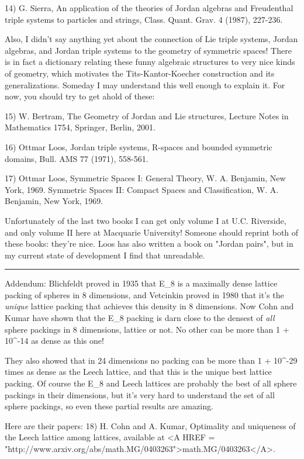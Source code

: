 14) G. Sierra, An application of the theories of Jordan algebras and 
Freudenthal triple systems to particles and strings, Class. Quant. Grav. 
4 (1987), 227-236.  

Also, I didn't say anything yet about the connection of Lie triple
systems, Jordan algebras, and Jordan triple systems to the geometry 
of symmetric spaces!  There is in fact a dictionary relating these 
funny algebraic structures to very nice kinds of geometry, which
motivates the Tits-Kantor-Koecher construction and its generalizations.
Someday I may understand this well enough to explain it.  For now, 
you should try to get ahold of these:

15) W. Bertram, The Geometry of Jordan and Lie structures, 
Lecture Notes in Mathematics 1754, Springer, Berlin, 2001.

16) Ottmar Loos, Jordan triple systems, R-spaces and bounded symmetric 
domains, Bull. AMS 77 (1971), 558-561. 

17) Ottmar Loos, Symmetric Spaces I: General Theory, W. A. Benjamin, 
New York, 1969.  Symmetric Spaces II: Compact Spaces and Classification,
W. A. Benjamin, New York, 1969.

Unfortunately of the last two books I can get only volume I at U.C. 
Riverside, and only volume II here at Macquarie University!  Someone 
should reprint both of these books: they're nice.  Loos has also
written a book on "Jordan pairs", but in my current state of
development I find that unreadable.

\par\noindent\rule{\textwidth}{0.4pt}
Addendum: Blichfeldt proved in 1935 that E_{8} is a maximally dense
lattice packing of spheres in 8 dimensions, and Vetcinkin proved
in 1980 that it's the \emph{unique} lattice packing that 
achieves this density in 8 dimensions.
Now Cohn and Kumar have shown that the E_{8} packing is darn close to the 
densest of \emph{all} sphere packings in 8 dimensions, lattice or not.
No other can be more than 1 + 10^{-14} as dense as this one!

They also showed that in 24 dimensions no packing can be more than
1 + 10^{-29} times as dense as the Leech lattice, and that
this is the unique best lattice packing.  Of course the 
E_{8} and Leech lattices are probably the best of all sphere packings 
in their dimensions, but it's very hard to understand the set of 
all sphere packings, so even these partial results are amazing.

Here are their papers:
18) H. Cohn and A. Kumar, Optimality and uniqueness of the 
Leech lattice among lattices, available at <A HREF = 
"http://www.arxiv.org/abs/math.MG/0403263">math.MG/0403263</A>.

